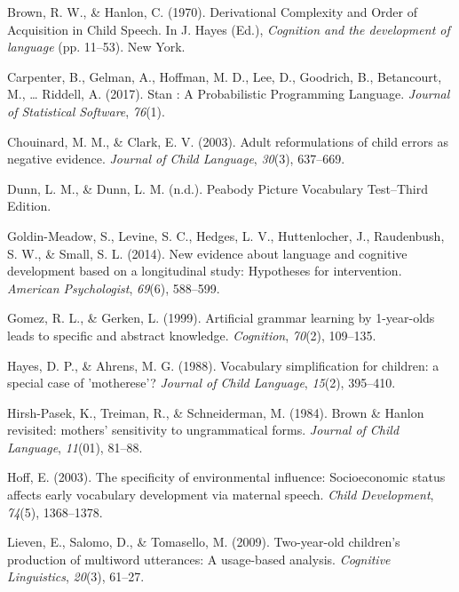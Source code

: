 \documentclass[10pt, letterpaper]{article}
\begin{document}
\noindent

\hypertarget{refs}{}
\leavevmode\hypertarget{ref-Brown:1970wd}{}%
Brown, R. W., \& Hanlon, C. (1970). Derivational Complexity and Order of
Acquisition in Child Speech. In J. Hayes (Ed.), \emph{Cognition and the
development of language} (pp. 11--53). New York.

\leavevmode\hypertarget{ref-Carpenter:2017ke}{}%
Carpenter, B., Gelman, A., Hoffman, M. D., Lee, D., Goodrich, B.,
Betancourt, M., \ldots{} Riddell, A. (2017). Stan : A Probabilistic
Programming Language. \emph{Journal of Statistical Software},
\emph{76}(1).

\leavevmode\hypertarget{ref-Chouinard:2003kq}{}%
Chouinard, M. M., \& Clark, E. V. (2003). Adult reformulations of child
errors as negative evidence. \emph{Journal of Child Language},
\emph{30}(3), 637--669.

\leavevmode\hypertarget{ref-PeabodyPictureVoca:im}{}%
Dunn, L. M., \& Dunn, L. M. (n.d.). Peabody Picture Vocabulary
Test--Third Edition.

\leavevmode\hypertarget{ref-GoldinMeadow:2014hr}{}%
Goldin-Meadow, S., Levine, S. C., Hedges, L. V., Huttenlocher, J.,
Raudenbush, S. W., \& Small, S. L. (2014). New evidence about language
and cognitive development based on a longitudinal study: Hypotheses for
intervention. \emph{American Psychologist}, \emph{69}(6), 588--599.

\leavevmode\hypertarget{ref-Gomez:1999bx}{}%
Gomez, R. L., \& Gerken, L. (1999). Artificial grammar learning by
1-year-olds leads to specific and abstract knowledge. \emph{Cognition},
\emph{70}(2), 109--135.

\leavevmode\hypertarget{ref-Hayes:1988ue}{}%
Hayes, D. P., \& Ahrens, M. G. (1988). Vocabulary simplification for
children: a special case of 'motherese'? \emph{Journal of Child
Language}, \emph{15}(2), 395--410.

\leavevmode\hypertarget{ref-HirshPasek:1984bd}{}%
Hirsh-Pasek, K., Treiman, R., \& Schneiderman, M. (1984). Brown \&
Hanlon revisited: mothers' sensitivity to ungrammatical forms.
\emph{Journal of Child Language}, \emph{11}(01), 81--88.

\leavevmode\hypertarget{ref-Hoff:2003kx}{}%
Hoff, E. (2003). The specificity of environmental influence:
Socioeconomic status affects early vocabulary development via maternal
speech. \emph{Child Development}, \emph{74}(5), 1368--1378.

\leavevmode\hypertarget{ref-Lieven:2009ii}{}%
Lieven, E., Salomo, D., \& Tomasello, M. (2009). Two-year-old children's
production of multiword utterances: A usage-based analysis.
\emph{Cognitive Linguistics}, \emph{20}(3), 61--27.
\end{document}
